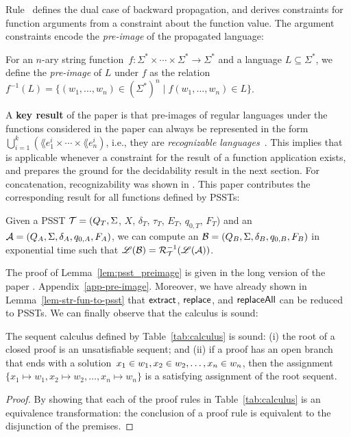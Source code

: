 Rule~ defines the dual case of backward
propagation, and derives \regexp{} constraints for function arguments
from a constraint about the function value. The argument constraints
encode the \emph{pre-image} of the propagated language:
%
\begin{definition}
  For an $n$-ary string
  function~$f : \Sigma^* \times \cdots \times \Sigma^* \to \Sigma^*$
  and a language $L \subseteq \Sigma^*$, we define the
  \emph{pre-image} of $L$ under $f$ as the relation
  $f^{-1}(L) = \{(w_1, \ldots, w_n) \in (\Sigma^*)^n \mid 
  f(w_1, \ldots, w_n) \in L\}$.
\end{definition}
A \textbf{key result} of the paper is that pre-images of regular
languages under the functions considered in the paper can always be
represented in the
form~$\bigcup_{i=1}^k ( \lang{e_1^i} \times \cdots \times \lang{e_n^i}
)$, i.e., they are \emph{recognizable languages}~\cite{CCG06}. This implies that
 is applicable whenever a \regexp{} constraint for the
result of a function application exists, and prepares the ground for
the decidability result in the next section.  For concatenation,
recognizability was shown in \cite{Abdulla14,CHL+19}. This paper
contributes the corresponding result for all functions defined by
PSSTs:
%
\begin{lemma}
  \label{lem:psst_preimage}
  Given a PSST $\mathcal{T} = (Q_T, \Sigma$, $X$, $\delta_T$, $\tau_T$, $E_T$,  $q_{0, T}$, $F_T$) and an \FA{} $\mathcal{A}
  = (Q_A, \Sigma, \delta_A, q_{0, A}, F_A)$, we can compute an \FA{} $\mathcal{B} = (Q_B,
  \Sigma, \delta_B, q_{0, B}, F_B)$ in exponential time  such that $\mathscr{L}(\mathcal{B}) = \mathcal{R}^{-1}_{\mathcal{T}}(\mathscr{L}(\mathcal{A}))$.
\end{lemma}
The proof of Lemma~\ref{lem:psst_preimage} is given in
\ifproceeding the long version of the paper \cite{popl22-full}.
\else Appendix~\ref{app-pre-image}. \fi 
%
Moreover, we have already shown in Lemma~\ref{lem-str-fun-to-psst} that $\mathsf{extract}$, $\mathsf{replace}$, and $\mathsf{replaceAll}$ can be reduced to PSSTs.
We can finally observe that the calculus is sound:
\begin{lemma}[Soundness]
  The sequent calculus defined by Table~\ref{tab:calculus} is sound:
  (i) the root of a closed proof is an unsatisfiable sequent; and (ii)
  if a proof has an open branch that ends with a
  solution~$x_1 \in w_1, x_2 \in w_2, \ldots, x_n \in w_n$, then
  the
  assignment~$\{x_1 \mapsto w_1, x_2 \mapsto w_2, \ldots, x_n \mapsto
  w_n\}$ is a satisfying assignment of the root sequent.
\end{lemma}

\begin{proof}
  By showing that each of the proof rules in Table~\ref{tab:calculus}
  is an equivalence transformation: the conclusion of a proof rule is
  equivalent to the disjunction of the premises.
\end{proof}

